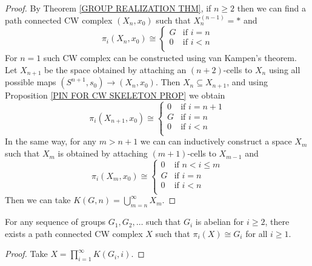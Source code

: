 \begin{proof}
By Theorem \ref{GROUP REALIZATION THM}, if $n\geq 2$ then we can find a path 
connected CW complex $(X_{n}, x_{0})$ such that $X_{n}^{(n-1)} = \ast$ and
\[
\pi_{i}(X_{n}, x_{0}) \cong 
\begin{cases}
G & \text{if } i = n\\
0 & \text{if } i < n\\
\end{cases}
\]
For $n=1$ such CW complex can be constructed using van Kampen’s theorem.
Let $X_{n+1}$ be the space obtained by attaching an $(n+2)$-cells to $X_{n}$
using all possible maps $(S^{n+1}, s_{0}) \to (X_{n}, x_{0})$. 
Then $X_{n}\subseteq X_{n+1}$, and using Proposition \ref{PIN FOR CW SKELETON PROP} 
we obtain 
\[
\pi_{i}(X_{n+1}, x_{0}) \cong 
\begin{cases}
0 & \text{if } i = n+1\\
G & \text{if } i = n\\
0 & \text{if } i < n\\
\end{cases}
\]
In the same way, for any $m > n+1$ we can can inductively construct a space $X_{m}$
such that $X_{m}$ is obtained by attaching $(m+1)$-cells to $X_{m-1}$ and  
\[
\pi_{i}(X_{m}, x_{0}) \cong 
\begin{cases}
0 & \text{if } n < i \leq m\\
G & \text{if } i = n\\
0 & \text{if } i < n\\
\end{cases}
\]
Then we can take $K(G, n) = \bigcup_{m=n}^{\infty} X_{m}$.
\end{proof}

\begin{corollary}
For any sequence of groups $G_{1}, G_{2}, \dots$ such that $G_{i}$ is abelian for 
$i\geq 2$, there exists a path connected CW complex $X$ such that 
$\pi_{i}(X) \cong G_{i}$ for all $i\geq 1$. 

\end{corollary}

\begin{proof}
Take $X = \prod_{i=1}^{\infty} K(G_{i}, i)$. 
\end{proof}



